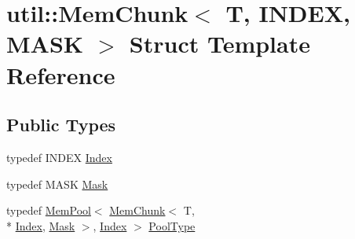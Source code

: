 \hypertarget{structutil_1_1MemChunk}{\section{util\-:\-:Mem\-Chunk$<$ T, I\-N\-D\-E\-X, M\-A\-S\-K $>$ Struct Template Reference}
\label{structutil_1_1MemChunk}
}
\subsection*{Public Types}
\begin{DoxyCompactItemize}
\item 
typedef I\-N\-D\-E\-X \hyperlink{structutil_1_1MemChunk_a4f05352eb1c778a4791abe24d912b837}{Index}
\item 
typedef M\-A\-S\-K \hyperlink{structutil_1_1MemChunk_a4ebe426d4977c2a9d95307cca65e3874}{Mask}
\item 
typedef \hyperlink{structutil_1_1MemPool}{Mem\-Pool}$<$ \hyperlink{structutil_1_1MemChunk}{Mem\-Chunk}$<$ T, \\*
\hyperlink{structutil_1_1MemChunk_a4f05352eb1c778a4791abe24d912b837}{Index}, \hyperlink{structutil_1_1MemChunk_a4ebe426d4977c2a9d95307cca65e3874}{Mask} $>$, \hyperlink{structutil_1_1MemChunk_a4f05352eb1c778a4791abe24d912b837}{Index} $>$ \hyperlink{structutil_1_1MemChunk_afd8dc8a7c608cfcaca89df49e5ff084b}{Pool\-Type}
\end{DoxyCompactItemize}
